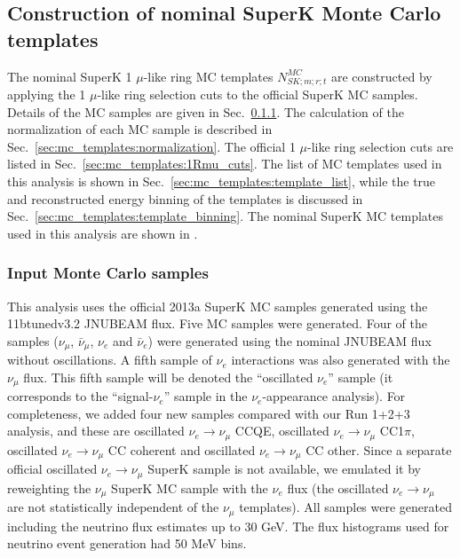 
\subsection {Construction of nominal SuperK Monte Carlo templates}
\label{sec:mc_templates}

The nominal SuperK 1 $\mu$-like ring MC templates $N_{SK;m;r;t}^{MC}$
are constructed by applying the 1 $\mu$-like ring selection cuts to the official SuperK MC samples.
Details of the MC samples are given in Sec.\ \ref{sec:mc_templates:input_mc}.
The calculation of the normalization of each MC sample is described in Sec.\ \ref{sec:mc_templates:normalization}.
The official 1 $\mu$-like ring selection cuts are listed in Sec.\ \ref{sec:mc_templates:1Rmu_cuts}.
The list of MC templates used in this analysis is shown in Sec.\ \ref{sec:mc_templates:template_list},
while the true and reconstructed energy binning of the templates is discussed 
in Sec.\ \ref{sec:mc_templates:template_binning}.
The nominal SuperK MC templates used in this analysis are shown in \cite{OurRun1234DisappAnalysisSupplement}.

\subsubsection {Input Monte Carlo samples}
\label{sec:mc_templates:input_mc}

This analysis uses the official 2013a SuperK MC samples generated using the 11btunedv3.2 JNUBEAM flux.
Five MC samples were generated.
Four of the samples
($\nu_{\mu}$, $\bar{\nu}_{\mu}$, $\nu_{e}$ and $\bar{\nu}_{e}$) 
were generated using the nominal JNUBEAM flux without oscillations.
A fifth sample of $\nu_{e}$ interactions was also generated with the $\nu_{\mu}$ flux.
This fifth sample will be denoted the ``oscillated $\nu_{e}$'' sample (it corresponds to the ``signal-$\nu_{e}$'' 
sample in the $\nu_{e}$-appearance analysis).
For completeness, we added four new samples compared with our Run 1+2+3 analysis, and these are oscillated $\nu_{e} \rightarrow \nu_{\mu}$ CCQE, 
oscillated $\nu_{e} \rightarrow \nu_{\mu}$ CC1$\pi$, oscillated $\nu_{e} \rightarrow \nu_{\mu}$ CC coherent and 
oscillated $\nu_{e} \rightarrow \nu_{\mu}$ CC other. Since a separate official oscillated $\nu_{e} \rightarrow \nu_{\mu}$ 
SuperK sample is not available, we emulated it by reweighting the $\nu_\mu$ SuperK MC sample with the $\nu_e$ flux
(the oscillated $\nu_{e} \rightarrow \nu_{\mu}$ are not statistically independent of the $\nu_\mu$ templates).
All samples were generated including the neutrino flux estimates up to 30 GeV.
The flux histograms used for neutrino event generation had 50 MeV bins.

